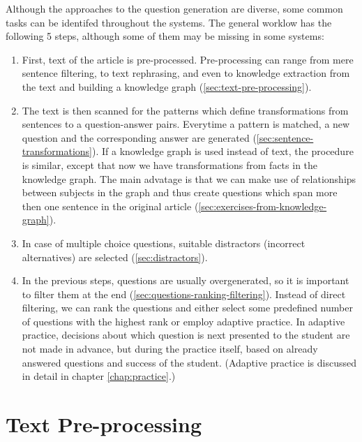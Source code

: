 \documentclass[12pt, twoside]{fithesis2}		%
\renewcommand{\_}{\leavevmode \kern0.07em\vbox{\hrule width0.4em}}
\newenvironment{myEnumerate}{
  \begin{enumerate}[leftmargin=2em,rightmargin=1em,itemsep=\parskip ,parsep=0em,topsep=0em,partopsep=0em]
}{
  \end{enumerate}
}
\newcounter{choice}
\begin{document}
Although the approaches to the question generation are diverse,
some common tasks can be identifed throughout the systems.
The general worklow has the following 5 steps, although some of them may be missing in some systems:
\begin{myEnumerate}
\item First, text of the article is pre-processed.
Pre-processing can range from mere sentence filtering,
to text rephrasing, and even to knowledge extraction from the text and building a knowledge graph
(\autoref{sec:text-pre-processing}).

\item The text is then scanned for the patterns which define transformations from sentences to a question-answer pairs.
  Everytime a pattern is matched, a new question and the corresponding answer are generated
  (\autoref{sec:sentence-transformations}).
  If a knowledge graph is used instead of text, the procedure is similar, except that now we have transformations from facts in the knowledge graph. The main advatage is that we can make use of relationships between subjects in the graph and thus create questions which span more then one sentence in the original article
  (\autoref{sec:exercises-from-knowledge-graph}).

\item In case of multiple choice questions, suitable distractors (incorrect alternatives) are selected
(\autoref{sec:distractors}).

\item In the previous steps, questions are usually overgenerated, so it is important to filter them at the end
  (\autoref{sec:questions-ranking-filtering}).
  Instead of direct filtering, we can rank the questions and either select some predefined number of questions with the highest rank
  or employ adaptive practice.
In adaptive practice, decisions about which question is next presented to the student
are not made in advance, but during the practice itself,
based on already answered questions and success of the student.
(Adaptive practice is discussed in detail in chapter \autoref{chap:practice}.)
\end{myEnumerate}

\section{Text Pre-processing}
\label{sec:text-pre-processing}
\end{document}
